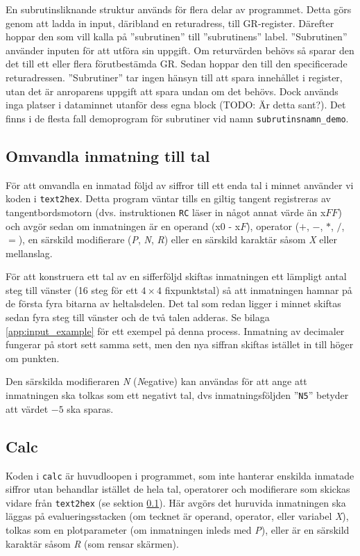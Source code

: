 \documentclass[]{article}
\begin{document}
En subrutinsliknande struktur används för flera delar av programmet. Detta görs genom att ladda in input, däribland en returadress, till GR-register. Därefter hoppar den som vill kalla på ''subrutinen'' till ''subrutinens'' label. ''Subrutinen'' använder inputen för att utföra sin uppgift. Om returvärden behövs så sparar den det till ett eller flera förutbestämda GR. Sedan hoppar den till den specificerade returadressen. ''Subrutiner'' tar ingen hänsyn till att spara innehållet i register, utan det är anroparens uppgift att spara undan om det behövs. Dock används inga platser i dataminnet utanför dess egna block (TODO: Är detta sant?). Det finns i de flesta fall demoprogram för subrutiner vid namn \texttt{subrutinsnamn\_demo}.

\subsection{Omvandla inmatning till tal}\label{sec:text2hex}
För att omvandla en inmatad följd av siffror till ett enda tal i minnet använder vi koden i \texttt{text2hex}. Detta program väntar tills en giltig tangent registreras av tangentbordsmotorn (dvs. instruktionen \texttt{RC} läser in något annat värde än x$FF$) och avgör sedan om inmatningen är en operand (x$0$ - x$F$), operator ($+$, $-$, $*$, $/$, $=$), en särskild modifierare (\textit{P}, \textit{N}, \textit{R}) eller en särskild karaktär såsom \textit{X} eller mellanslag.

För att konstruera ett tal av en sifferföljd skiftas inmatningen ett lämpligt antal steg till vänster (16 steg för ett $4 \times 4$ fixpunktstal) så att inmatningen hamnar på de första fyra bitarna av heltalsdelen. Det tal som redan ligger i minnet skiftas sedan fyra steg till vänster och de två talen adderas. Se bilaga \ref{app:input_example} för ett exempel på denna process. Inmatning av decimaler fungerar på stort sett samma sett, men den nya siffran skiftas istället in till höger om punkten.

Den särskilda modifieraren \textit{N} (\textit{N}egative) kan användas för att ange att inmatningen ska tolkas som ett negativt tal, dvs inmatningsföljden ''\texttt{N5}'' betyder att värdet $-5$ ska sparas.

\subsection{Calc}
Koden i \texttt{calc} är huvudloopen i programmet, som inte hanterar enskilda inmatade siffror utan behandlar istället de hela tal, operatorer och modifierare som skickas vidare från \texttt{text2hex} (se sektion \ref{sec:text2hex}). Här avgörs det huruvida inmatningen ska läggas på evalueringsstacken (om tecknet är operand, operator, eller variabel \textit{X}), tolkas som en plotparameter (om inmatningen inleds med \textit{P}), eller är en särskild karaktär såsom \textit{R} (som rensar skärmen).
\end{document}
